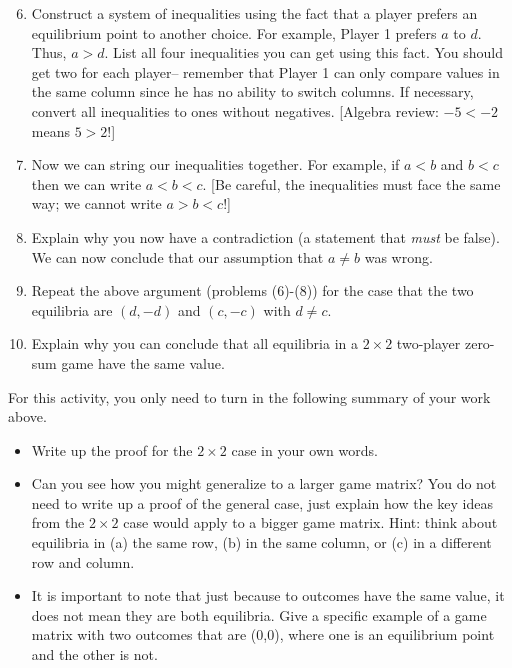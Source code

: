 \begin{enumerate}
\setcounter{enumi}{5}

\item Construct a system of inequalities using the fact that a player prefers an equilibrium point to another choice. For example, Player 1 prefers $a$ to $d$. Thus, $a > d$. List all four inequalities you can get using this fact. You should get two for each player-- remember that Player 1 can only compare values in the same column  since he has no ability to switch columns. If necessary, convert all inequalities to ones without negatives. [Algebra review: $-5 < -2$ means $5 > 2$!]
\vspace{.1in}

\item Now we can string our inequalities together. For example, if $a < b$ and $b < c$ then we can write $a < b < c$. [Be careful, the inequalities must face the same way; we cannot write $a> b < c$!]
\vspace{.1in}

\item Explain why you now have a contradiction (a statement that {\it must} be false). 
We can now conclude that our assumption that $a \neq b$ was wrong.
\vspace{.1in}

\item Repeat the above argument (problems (6)-(8)) for the case that the two equilibria are $(d, -d)$ and $(c, -c)$ with $d\neq c$.
\vspace{.1in}

\item Explain why you can conclude that all equilibria in a $2 \times 2$ two-player zero-sum game have the same value.
\vspace{.1in}

\end{enumerate}

\noindent
For this activity, you only need to turn in the following summary of your work above.
\begin{itemize}
\item Write up the proof for the $2 \times 2$ case in your own words.

\item Can you see how you might generalize to a larger game matrix? You do not need to write up a proof of the general case, just explain how the key ideas from the $2 \times 2$ case would apply to a bigger game matrix. Hint: think about equilibria in (a) the same row, (b) in the same column, or (c) in a different row and column. 

\item It is important to note that just because to outcomes have the same value, it does not mean they are both equilibria. Give a specific example of a game matrix with two outcomes that are (0,0), where one is an equilibrium point and the other is not.
\end{itemize}




 